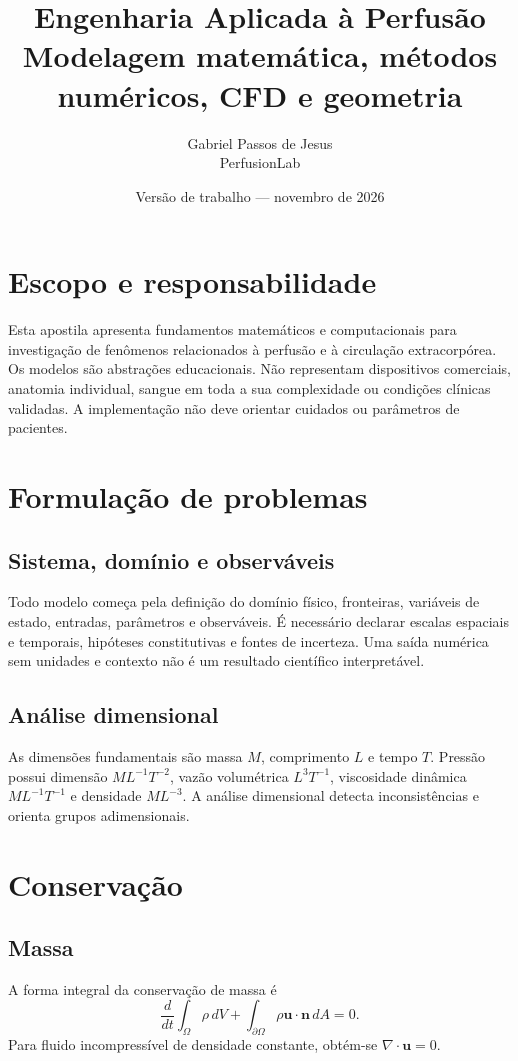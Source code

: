 \documentclass[11pt,a4paper,oneside]{book}
\title{Engenharia Aplicada à Perfusão\\\large Modelagem matemática, métodos numéricos, CFD e geometria}
\author{Gabriel Passos de Jesus\\\small PerfusionLab}
\date{Versão de trabalho — novembro de 2026}
\begin{document}
\frontmatter
\maketitle
\chapter*{Escopo e responsabilidade}
Esta apostila apresenta fundamentos matemáticos e computacionais para investigação de fenômenos relacionados à perfusão e à circulação extracorpórea. Os modelos são abstrações educacionais. Não representam dispositivos comerciais, anatomia individual, sangue em toda a sua complexidade ou condições clínicas validadas. A implementação não deve orientar cuidados ou parâmetros de pacientes.
\tableofcontents
\mainmatter
\chapter{Formulação de problemas}
\section{Sistema, domínio e observáveis}
Todo modelo começa pela definição do domínio físico, fronteiras, variáveis de estado, entradas, parâmetros e observáveis. É necessário declarar escalas espaciais e temporais, hipóteses constitutivas e fontes de incerteza. Uma saída numérica sem unidades e contexto não é um resultado científico interpretável.

\section{Análise dimensional}
As dimensões fundamentais são massa $M$, comprimento $L$ e tempo $T$. Pressão possui dimensão $ML^{-1}T^{-2}$, vazão volumétrica $L^3T^{-1}$, viscosidade dinâmica $ML^{-1}T^{-1}$ e densidade $ML^{-3}$. A análise dimensional detecta inconsistências e orienta grupos adimensionais.

\chapter{Conservação}
\section{Massa}
A forma integral da conservação de massa é
\[
\frac{d}{dt}\int_{\Omega}\rho\,dV+
\int_{\partial\Omega}\rho\mathbf{u}\cdot\mathbf{n}\,dA=0.
\]
Para fluido incompressível de densidade constante, obtém-se $\nabla\cdot\mathbf{u}=0$.
\end{document}
